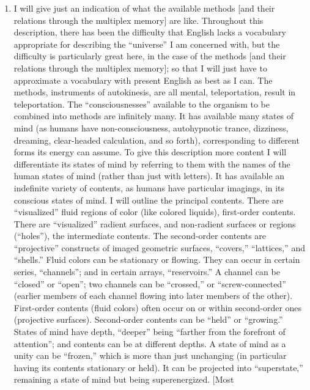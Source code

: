 \begin{enumerate}[wide, nosep, itemsep=0.5em]
\item I will give just an indication of what the available methods [and 
their relations through the multiplex memory] are like. Throughout this 
description, there has been the difficulty that English lacks a vocabulary 
appropriate for describing the \enquote{universe} I am concerned with, but the 
difficulty is particularly great here, in the case of the methods [and their 
relations through the multiplex memory]; so that I will just have to 
approximate a vocabulary with present English as best as I can. The 
methods, instruments of autokinesis, are all mental, teleportation, result in 
teleportation. The \enquote{consciousnesses} available to the organism to be 
combined into methods are infinitely many. It has available many states of 
mind (as humans have non-consciousness, autohypnotic trance, dizziness, 
dreaming, clear-headed calculation, and so forth), corresponding to different 
forms its energy can assume. To give this description more content I will 
differentiate its states of mind by referring to them with the names of the 
human states of mind (rather than just with letters). It has available an 
indefinite variety of contents, as humans have particular imagings, in its 
conscious states of mind. I will outline the principal contents. There are 
\enquote{visualized} fluid regions of color (like colored liquids), first-order contents. 
There are \enquote{visualized} radient surfaces, and non-radient surfaces or regions 
(\enquote{holes}), the intermediate contents. The second-order contents are 
\enquote{projective} constructs of imaged geometric surfaces, \enquote{covers,} \enquote{lattices,} 
and \enquote{shells.} Fluid colors can be stationary or flowing. They can occur in 
certain series, \enquote{channels}; and in certain arrays, \enquote{reservoirs.} A channel can 
be \enquote{closed} or \enquote{open}; two channels can be \enquote{crossed,} or 
\enquote{screw-connected} (earlier members of each channel flowing into later 
members of the other). First-order contents (fluid colors) often occur on or 
within second-order ones (projective surfaces). Second-order contents can be 
\enquote{held} or \enquote{growing.} States of mind have depth, \enquote{deeper} being \enquote{farther from 
the forefront of attention}; and contents can be at different depths. A state 
of mind as a unity can be \enquote{frozen,} which is more than just unchanging (in 
particular having its contents stationary or held). It can be projected into 
\enquote{superstate,} remaining a state of mind but being superenergized. [Most 

\end{enumerate}

